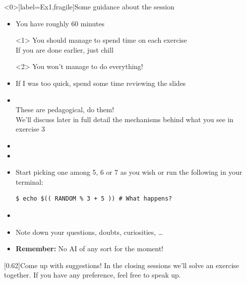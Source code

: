 
\begin{frame}<0>[label=Ex1,fragile]{Some guidance about the session}
    \vspace{-2mm}
    \begin{itemize}
        \item You have roughly 60 minutes\\
              \begin{onlyenv}<1>
                  \then You should manage to spend time on each exercise\\
                  \then If you are done earlier, just chill 
              \end{onlyenv}
              \begin{onlyenv}<2>
                  \then You won't manage to do everything! 
              \end{onlyenv}
        \item<only@1> If I was too quick, spend some time reviewing the slides \\
                      \then {}
        \item<only@1> \\
                      \then These are pedagogical, do them!\\
                      \then We'll discuss later in full detail the mechanisms behind what you see in exercise 3
        \item<only@2> 
        \item<only@2> 
        \item<only@2> Start picking one among 5, 6 or 7 as you wish or run the following in your terminal:
              \begin{lstlisting}[style=MyBash, aboveskip=3mm, numbers=none, xrightmargin=30mm]
                  $ echo $(( RANDOM % 3 + 5 )) # What happens?
              \end{lstlisting}
        \item<only@2> 
        \item Note down your questions, doubts, curiosities, \ldots
        \item \alert{\textbf{Remember:} No AI of any sort for the moment!} 
    \end{itemize}
    \begin{varblock}{}[0.62\textwidth]{Come up with suggestions!}
        In the closing sessions we'll solve an exercise together.
        If you have any preference, feel free to speak up.
    \end{varblock}
\end{frame}
